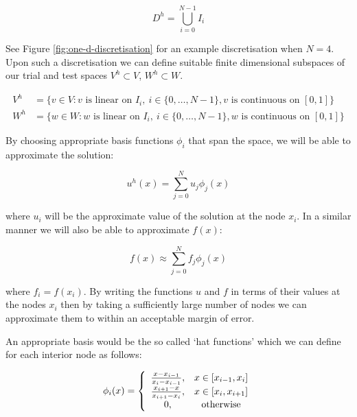 \[
    D^h = \bigcup_{i=0}^{N - 1} I_i
\]

See Figure \ref{fig:one-d-discretisation} for an example discretisation
when $N=4$.  Upon such a discretisation we can define suitable finite
dimensional subspaces of our trial and test spaces $V^h \subset V$, $W^h
\subset W$.

\begin{align*}
    V^h &= \{v \in V: v \text{ is linear on } I_i,
          \ i \in \{0, \ldots, N - 1\},
          v \text{ is continuous on } [0, 1]\} \\
    W^h &= \{w \in W: w \text{ is linear on } I_i,
          \ i \in \{0, \ldots, N - 1\},
          w \text{ is continuous on } [0, 1]\}
\end{align*}

By choosing appropriate basis functions $\phi_i$ that span the space, we will
be able to approximate the solution:

\begin{equation}\label{eq:one-d-approx-soln}
    u^h(x) = \sum_{j = 0}^N{u_j\phi_j(x)}
\end{equation}

where $u_i$ will be the approximate value of the solution at the node $x_i$. In
a similar manner we will also be able to approximate $f(x)$:

\begin{equation}
    f(x) \approx \sum_{j = 0}^N f_j\phi_j(x)
\end{equation}

where $f_i = f(x_i)$. By writing the functions $u$ and $f$ in terms of their
values at the nodes $x_i$ then by taking a sufficiently large number of nodes
we can approximate them to within an acceptable margin of error.

An appropriate basis would be the so called `hat functions' which we can define
for each interior node as follows:

\begin{equation}\label{eq:one-d-hat-basis}
    \phi_i(x) = \left\{\begin{array}{c c}
                    \frac{x - x_{i-1}}{x_i - x_{i - 1}}, & x \in [x_{i-1}, x_i] \\
                    \frac{x_{i+1} - x}{x_{i + 1} - x_i}, & x \in [x_i, x_{i + 1}] \\
                    0, & \text{otherwise}
                \end{array}\right.
\end{equation}

